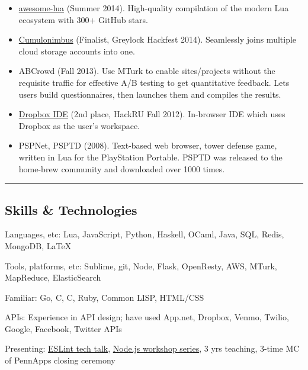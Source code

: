 \documentclass[10pt,letterpaper]{article}
\newenvironment{indentsection}[1]%
{\begin{list}{}%
	{\setlength{\leftmargin}{#1}}%
	\item[]%
}
{\end{list}}
\newcommand{\CPP}
{C\nolinebreak[4]\hspace{-.05em}\raisebox{.22ex}{\footnotesize\bf ++}}
\begin{document}
\begin{itemize}
	\parskip=-0.1em

	\item
	\href{https://github.com/LewisJEllis/awesome-lua}{awesome-lua} (Summer 2014). High-quality compilation of the modern Lua ecosystem with 300+ GitHub stars.
	\item
	\href{https://github.com/maxscheiber/cumulonimbus}{Cumulonimbus} (Finalist, Greylock Hackfest 2014). Seamlessly joins multiple cloud storage accounts into one.
	\item
	ABCrowd (Fall 2013). Use MTurk to enable sites/projects without the requisite traffic for effective A/B testing to get quantitative feedback. Lets users build questionnaires, then launches them and compiles the results.
	\item
	\href{https://github.com/yefim/DBIDE}{Dropbox IDE} (2nd place, HackRU Fall 2012). In-browser IDE which uses Dropbox as the user's workspace.
	\item
	PSPNet, PSPTD (2008). Text-based web browser, tower defense game, written in Lua for the PlayStation Portable. PSPTD was released to the home-brew community and downloaded over 1000 times.
\end{itemize}


\hrule
\vspace{-0.7em}
\subsection*{Skills \& Technologies}

\begin{indentsection}{\parindent}
\begin{description*}
	\item[Languages, etc:]
	Lua, JavaScript, Python, Haskell, OCaml, Java, SQL, Redis, MongoDB, \LaTeX
	\item[Tools, platforms, etc:] Sublime, git, Node, Flask, OpenResty, AWS, MTurk, MapReduce, ElasticSearch
	\item[Familiar:] Go, C, \CPP, Ruby, Common LISP, HTML/CSS
	\item[APIs:] Experience in API design; have used App.net, Dropbox, Venmo, Twilio, Google, Facebook, Twitter APIs
	\item[Presenting:] \href{https://github.com/LewisJEllis/eslint101}{ESLint tech talk}, \href{https://github.com/LewisJEllis/nodejs-workshops}{Node.js workshop series}, 3 yrs teaching, 3-time MC of PennApps closing ceremony
\end{description*}
\end{indentsection}
\end{document}
